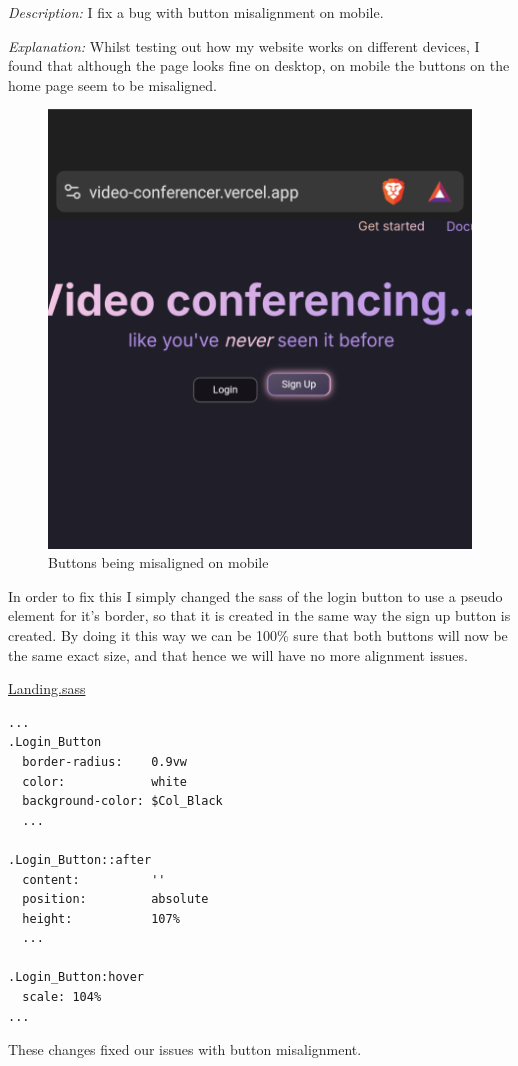 \textit{Description:} I fix a bug with button misalignment on 
mobile. \\ \vspace{0.2cm}

\textit{Explanation:} Whilst testing out how my website works
on different devices, I found that although the page looks 
fine on desktop, on mobile the buttons on the home page seem
to be misaligned. \\

\begin{figure}[h]
\centering

\includegraphics[scale=0.2]{Images/Button_misalignment.png}

\caption{Buttons being misaligned on mobile}
\end{figure}

In order to fix this I simply changed the sass of the login
button to use a pseudo element for it's border, so that it is
created in the same way the sign up button is created. By
doing it this way we can be 100\% sure that both buttons will
now be the same exact size, and that hence we will have no
more alignment issues. \\ \vspace{0.2cm}

\underline{Landing.sass}

\begin{verbatim}
...
.Login_Button
  border-radius:    0.9vw 
  color:            white
  background-color: $Col_Black
  ... 

.Login_Button::after
  content:          ''
  position:         absolute
  height:           107%
  ...

.Login_Button:hover
  scale: 104%
...
\end{verbatim}

These changes fixed our issues with button misalignment.
